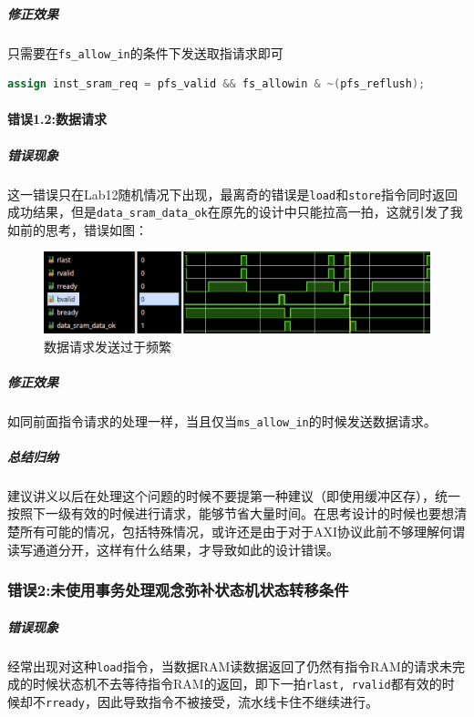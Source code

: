 \documentclass[UTF-8,twoside,c5size]{ctexart}
\begin{document}
	\subparagraph{修正效果}\hfill
	
	只需要在\texttt{fs_allow_in}的条件下发送取指请求即可
	
	\begin{lstlisting}[language=verilog]
    assign inst_sram_req = pfs_valid && fs_allowin & ~(pfs_reflush);
	\end{lstlisting}
	
	\paragraph{错误\textbf{1.2:}数据请求}\hfill
	
	\subparagraph{错误现象}\hfill
	
	这一错误只在Lab12随机情况下出现，最离奇的错误是\texttt{load}和\texttt{store}指令同时返回成功结果，但是\texttt{data_sram_data_ok}在原先的设计中只能拉高一拍，这就引发了我如前的思考，错误如图：
	
	\begin{figure}[h]
		\centering
		\includegraphics[width=0.8\linewidth]{data_req_frequently.png}
		\caption[data_req_frequently]{数据请求发送过于频繁}
		\label{fig:data_req_frequently}
	\end{figure}

	\subparagraph{修正效果}\hfill
	
	如同前面指令请求的处理一样，当且仅当\texttt{ms_allow_in}的时候发送数据请求。
	
	\subparagraph{总结归纳}\hfill
	
	建议讲义以后在处理这个问题的时候不要提第一种建议（即使用缓冲区存），统一按照下一级有效的时候进行请求，能够节省大量时间。在思考设计的时候也要想清楚所有可能的情况，包括特殊情况，或许还是由于对于AXI协议此前不够理解何谓读写通道分开，这样有什么结果，才导致如此的设计错误。
	
	\subsubsection{错误\textbf{2:}未使用事务处理观念弥补状态机状态转移条件}
	\label{business}
	
	\subparagraph{错误现象}\hfill
	
	经常出现对这种\texttt{load}指令，当数据RAM读数据返回了仍然有指令RAM的请求未完成的时候状态机不去等待指令RAM的返回，即下一拍\texttt{rlast, rvalid}都有效的时候却不\texttt{rready}，因此导致指令不被接受，流水线卡住不继续进行。
	
\end{document}
